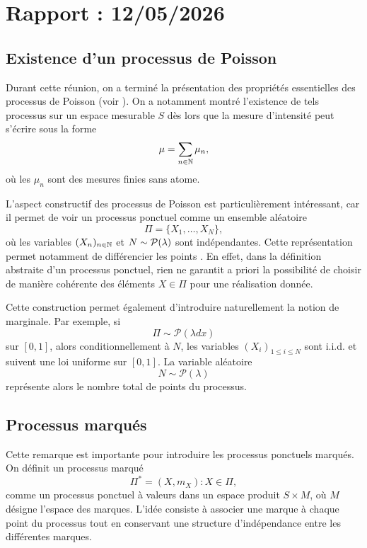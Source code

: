 \section{Rapport : 12/05/2026}
\subsection{Existence d'un processus de Poisson}

\begin{important}
	Durant cette réunion, on a terminé la présentation des propriétés essentielles des processus de Poisson (voir \cite{king_poisson}). On a notamment montré l'existence de tels processus sur un espace mesurable $S$ dès lors que la mesure d'intensité peut s'écrire sous la forme
	\[
		\mu = \sum_{n \in \mathbb{N}} \mu_n,
	\]
	où les $\mu_n$ sont des mesures finies sans atome.
\end{important}


L'aspect constructif des processus de Poisson est particulièrement intéressant, car il permet de voir un processus ponctuel comme un ensemble aléatoire
\[
	\Pi = \{X_1,\dots,X_N\},
\]
où les variables $(X_n)_{n\in\mathbb{N}}$ et $N \sim \mathcal{P}(\lambda)$ sont indépendantes. Cette représentation permet notamment de \og différencier les points \fg{}. En effet, dans la définition abstraite d'un processus ponctuel, rien ne garantit a priori la possibilité de choisir de manière cohérente des éléments $X\in \Pi$ pour une réalisation donnée.

Cette construction permet également d'introduire naturellement la notion de marginale. Par exemple, si
\[
	\Pi \sim \mathcal P(\lambda dx)
\]
sur $[0,1]$, alors conditionnellement à $N$, les variables $(X_i)_{1 \le i \le N}$ sont i.i.d. et suivent une loi uniforme sur $[0,1]$. La variable aléatoire
\[
	N \sim \mathcal P(\lambda)
\]
représente alors le nombre total de points du processus.

\subsection{Processus marqués}

Cette remarque est importante pour introduire les processus ponctuels marqués. On définit un processus marqué
\[
	\Pi^* = {(X,m_X) : X \in \Pi},
\]
comme un processus ponctuel à valeurs dans un espace produit $S\times M$, où $M$ désigne l'espace des marques. L'idée consiste à associer une marque à chaque point du processus tout en conservant une structure d'indépendance entre les différentes marques.

